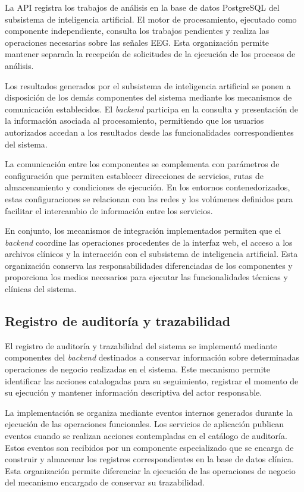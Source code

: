 La API registra los trabajos de análisis en la base de datos PostgreSQL del subsistema de inteligencia artificial. El motor de procesamiento, ejecutado como componente independiente, consulta los trabajos pendientes y realiza las operaciones necesarias sobre las señales EEG. Esta organización permite mantener separada la recepción de solicitudes de la ejecución de los procesos de análisis.

Los resultados generados por el subsistema de inteligencia artificial se ponen a disposición de los demás componentes del sistema mediante los mecanismos de comunicación establecidos. El \textit{backend} participa en la consulta y presentación de la información asociada al procesamiento, permitiendo que los usuarios autorizados accedan a los resultados desde las funcionalidades correspondientes del sistema.

La comunicación entre los componentes se complementa con parámetros de configuración que permiten establecer direcciones de servicios, rutas de almacenamiento y condiciones de ejecución. En los entornos contenedorizados, estas configuraciones se relacionan con las redes y los volúmenes definidos para facilitar el intercambio de información entre los servicios.

En conjunto, los mecanismos de integración implementados permiten que el \textit{backend} coordine las operaciones procedentes de la interfaz web, el acceso a los archivos clínicos y la interacción con el subsistema de inteligencia artificial. Esta organización conserva las responsabilidades diferenciadas de los componentes y proporciona los medios necesarios para ejecutar las funcionalidades técnicas y clínicas del sistema.

\subsection{Registro de auditoría y trazabilidad}

El registro de auditoría y trazabilidad del sistema se implementó mediante componentes del \textit{backend} destinados a conservar información sobre determinadas operaciones de negocio realizadas en el sistema. Este mecanismo permite identificar las acciones catalogadas para su seguimiento, registrar el momento de su ejecución y mantener información descriptiva del actor responsable.

La implementación se organiza mediante eventos internos generados durante la ejecución de las operaciones funcionales. Los servicios de aplicación publican eventos cuando se realizan acciones contempladas en el catálogo de auditoría. Estos eventos son recibidos por un componente especializado que se encarga de construir y almacenar los registros correspondientes en la base de datos clínica. Esta organización permite diferenciar la ejecución de las operaciones de negocio del mecanismo encargado de conservar su trazabilidad.

